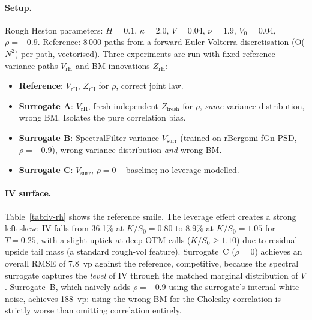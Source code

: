\documentclass[11pt,a4paper]{article}
\begin{document}
\paragraph{Setup.}
Rough Heston parameters:
$H = 0.1$, $\kappa = 2.0$, $\bar{V} = 0.04$, $\nu = 1.9$,
$V_0 = 0.04$, $\rho = -0.9$.
Reference: 8\,000 paths from a forward-Euler Volterra discretisation
(O($N^2$) per path, vectorised).
Three experiments are run with fixed reference variance paths
$V_{\mathrm{rH}}$ and BM innovations $Z_{\mathrm{rH}}$:
\begin{itemize}[nosep]
 \item \textbf{Reference}: $V_{\mathrm{rH}}$, $Z_{\mathrm{rH}}$
    for $\rho$, correct joint law.
 \item \textbf{Surrogate A}: $V_{\mathrm{rH}}$, fresh independent
    $Z_{\mathrm{fresh}}$ for $\rho$, \emph{same} variance
    distribution, wrong BM. Isolates the pure correlation bias.
 \item \textbf{Surrogate B}: SpectralFilter variance $V_{\mathrm{surr}}$
    (trained on rBergomi fGn PSD, $\rho = -0.9$), wrong variance
    distribution \emph{and} wrong BM.
 \item \textbf{Surrogate C}: $V_{\mathrm{surr}}$, $\rho = 0$ --
    baseline; no leverage modelled.
\end{itemize}

\paragraph{IV surface.}
Table~\ref{tab:iv-rh} shows the reference smile.
The leverage effect creates a strong left skew: IV falls from 36.1\% at
$K/S_0 = 0.80$ to 8.9\% at $K/S_0 = 1.05$ for $T = 0.25$, with a
slight uptick at deep OTM calls ($K/S_0 \geq 1.10$) due to residual
upside tail mass (a standard rough-vol feature).
Surrogate~C ($\rho = 0$) achieves an overall RMSE of 7.8~vp against the
reference, competitive, because the spectral surrogate captures the
\emph{level} of IV through the matched marginal distribution of $V$.
Surrogate~B, which naively adds $\rho = -0.9$ using the surrogate's
internal white noise, achieves 188~vp: using the wrong BM for the
Cholesky correlation is strictly worse than omitting correlation
entirely.
\end{document}
